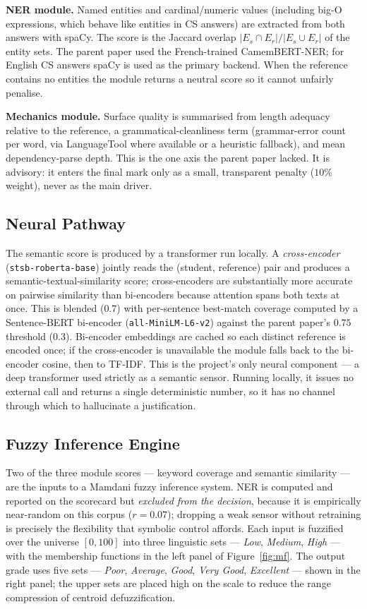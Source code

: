 \documentclass[11pt,a4paper]{article}
\begin{document}
\textbf{NER module.} Named entities and cardinal/numeric values (including big-O
expressions, which behave like entities in CS answers) are extracted from both
answers with spaCy. The score is the Jaccard overlap
$|E_s \cap E_r| / |E_s \cup E_r|$ of the entity sets. The parent paper used the
French-trained CamemBERT-NER; for English CS answers spaCy is used as the primary
backend. When the reference contains no entities the module returns a neutral
score so it cannot unfairly penalise.

\textbf{Mechanics module.} Surface quality is summarised from length adequacy
relative to the reference, a grammatical-cleanliness term (grammar-error count per
word, via LanguageTool where available or a heuristic fallback),
and mean dependency-parse depth. This is the one axis the parent paper lacked. It
is advisory: it enters the final mark only as a small, transparent penalty
($10\%$ weight), never as the main driver.

\subsection{Neural Pathway}

The semantic score is produced by a transformer run locally. A \emph{cross-encoder}
(\texttt{stsb-roberta-base}) jointly reads the (student, reference) pair and
produces a semantic-textual-similarity score; cross-encoders are substantially more
accurate on pairwise similarity than bi-encoders because attention spans both texts
at once. This is blended ($0.7$) with per-sentence best-match coverage computed by a
Sentence-BERT bi-encoder (\texttt{all-MiniLM-L6-v2}) against the parent paper's
$0.75$ threshold ($0.3$). Bi-encoder embeddings are cached so each distinct
reference is encoded once; if the cross-encoder is unavailable the module falls back
to the bi-encoder cosine, then to TF-IDF. This is the project's only neural
component --- a deep transformer used strictly as a semantic sensor. Running
locally, it issues no external call and returns a single deterministic number, so it
has no channel through which to hallucinate a justification.

\subsection{Fuzzy Inference Engine}

Two of the three module scores --- keyword coverage and semantic similarity ---
are the inputs to a Mamdani fuzzy inference system. NER is computed and reported on
the scorecard but \emph{excluded from the decision}, because it is empirically
near-random on this corpus ($r=0.07$); dropping a weak sensor without retraining is
precisely the flexibility that symbolic control affords. Each input is fuzzified
over the universe $[0,100]$ into three linguistic sets --- \emph{Low},
\emph{Medium}, \emph{High} --- with the membership functions in the left panel of
Figure~\ref{fig:mf}. The output grade uses five sets --- \emph{Poor},
\emph{Average}, \emph{Good}, \emph{Very Good}, \emph{Excellent} --- shown in the
right panel; the upper sets are placed high on the scale to reduce the range
compression of centroid defuzzification.
\end{document}
